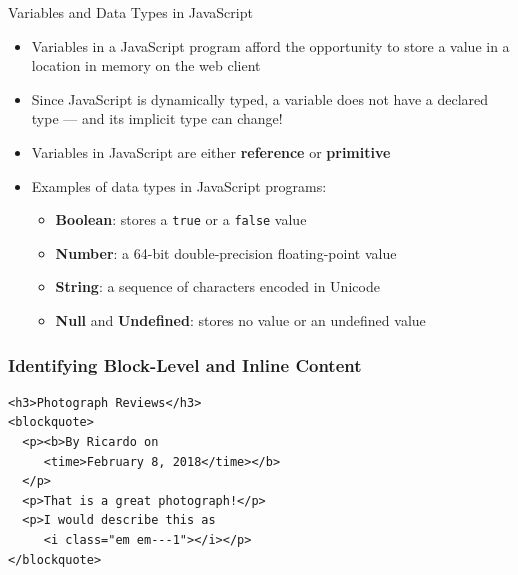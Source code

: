 \documentclass[14pt,aspectratio=169]{beamer}
\begin{document}
%
\begin{frame}{Variables and Data Types in JavaScript}
  \begin{itemize}
    \item Variables in a JavaScript program afford the opportunity to store a
      value in a location in memory on the web client
      \vspace*{-.15in}
    \item Since JavaScript is dynamically typed, a variable does not have a
      declared type --- and its implicit type can change!
      \vspace*{-.15in}
    \item Variables in JavaScript are either {\bf reference} or {\bf primitive}
      \vspace*{-.15in}
    \item Examples of data types in JavaScript programs:
      \begin{itemize}
        \item {\bf Boolean}: stores a {\tt true} or a {\tt false} value
        \item {\bf Number}: a 64-bit double-precision floating-point value
        \item {\bf String}: a sequence of characters encoded in Unicode
        \item {\bf Null} and {\bf Undefined}: stores no value or an undefined value
      \end{itemize}
      \vspace*{-.2in}
  \end{itemize}
\end{frame}

%
\begin{frame}[fragile]
  \frametitle{Identifying Block-Level and Inline Content}
  \normalsize
  \begin{minipage}{6in}
    \vspace*{.1in}
    \begin{verbatim}
<h3>Photograph Reviews</h3>
<blockquote>
  <p><b>By Ricardo on
     <time>February 8, 2018</time></b>
  </p>
  <p>That is a great photograph!</p>
  <p>I would describe this as
     <i class="em em---1"></i></p>
</blockquote>
    \end{verbatim}
  \end{minipage}
%
\end{frame}
\end{document}

